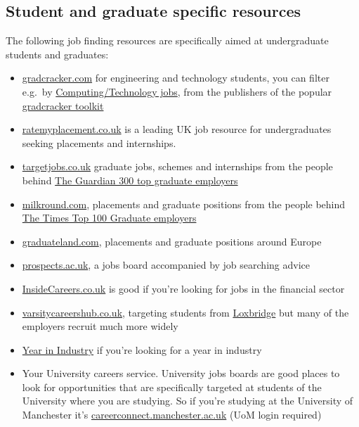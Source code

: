 \documentclass[
]{book}
\providecommand{\tightlist}{%
  \setlength{\itemsep}{0pt}\setlength{\parskip}{0pt}}
\begin{document}
\hypertarget{studentjobs}{%
\subsection{Student and graduate specific resources}\label{studentjobs}}

The following job finding resources are specifically aimed at undergraduate students and graduates:

\begin{itemize}
\tightlist
\item
  \href{http://www.gradcracker.com/}{gradcracker.com} for engineering and technology students, you can filter e.g.~by \href{https://www.gradcracker.com/search/computing-technology/jobs}{Computing/Technology jobs}, from the publishers of the popular \href{http://www.gradcracker.com/career-centre/toolkit}{gradcracker toolkit}
\item
  \href{http://www.ratemyplacement.co.uk/}{ratemyplacement.co.uk} is a leading UK job resource for undergraduates seeking placements and internships.
\item
  \href{http://www.targetjobs.co.uk/}{targetjobs.co.uk} graduate jobs, schemes and internships from the people behind \href{https://targetjobs.co.uk/uk300}{The Guardian 300 top graduate employers}
\item
  \href{http://www.milkround.com/}{milkround.com}, placements and graduate positions from the people behind \href{https://digital.top100graduateemployers.com/view/979434180/}{The Times Top 100 Graduate employers}
\item
  \href{https://graduateland.com/}{graduateland.com}, placements and graduate positions around Europe
\item
  \href{https://www.prospects.ac.uk/}{prospects.ac.uk}, a jobs board accompanied by job searching advice
\item
  \href{https://www.insidecareers.co.uk}{InsideCareers.co.uk} is good if you're looking for jobs in the financial sector
\item
  \href{https://www.varsitycareershub.co.uk/}{varsitycareershub.co.uk}, targeting students from \href{https://en.wikipedia.org/wiki/Loxbridge}{Loxbridge} but many of the employers recruit much more widely
\item
  \href{https://www.etrust.org.uk/yini-vacancies}{Year in Industry} if you're looking for a year in industry
\item
  Your University careers service. University jobs boards are good places to look for opportunities that are specifically targeted at students of the University where you are studying. So if you're studying at the University of Manchester it's \href{https://careerconnect.manchester.ac.uk/user/jobs.html}{careerconnect.manchester.ac.uk} (UoM login required)
\end{itemize}
\end{document}
